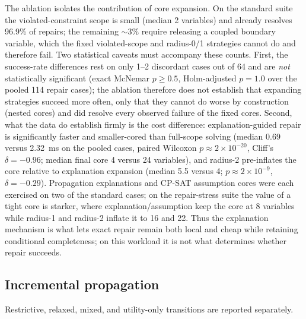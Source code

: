 \documentclass[pdflatex,sn-mathphys-num,iicol,oneside]{sn-jnl}
\begin{document}
The ablation isolates the contribution of core expansion. On the
standard suite the violated-constraint scope is small (median 2
variables) and already resolves 96.9\% of repairs; the remaining
$\sim 3\%$ require releasing a coupled boundary variable, which the
fixed violated-scope and radius-0/1 strategies cannot do and therefore
fail. Two statistical caveats must accompany these counts. First, the
success-rate differences rest on only 1--2 discordant cases out of 64
and are \emph{not} statistically significant (exact McNemar
$p\ge 0.5$, Holm-adjusted $p=1.0$ over the pooled 114 repair cases);
the ablation therefore does not establish that expanding strategies
succeed more often, only that they cannot do worse by construction
(nested cores) and did resolve every observed failure of the fixed
cores. Second, what the data do establish firmly is the cost
difference: explanation-guided repair is significantly faster and
smaller-cored than full-scope solving (median 0.69 versus 2.32~ms on
the pooled cases, paired Wilcoxon $p\approx 2\times10^{-20}$, Cliff's
$\delta=-0.96$; median final core 4 versus 24 variables), and radius-2
pre-inflates the core relative to explanation expansion (median 5.5
versus 4; $p\approx 2\times10^{-9}$, $\delta=-0.29$). Propagation
explanations and CP-SAT assumption cores were each exercised on two of
the standard cases; on the repair-stress suite the value of a tight
core is starker, where explanation/assumption keep the core at 8
variables while radius-1 and radius-2 inflate it to 16 and 22. Thus the
explanation mechanism is what lets exact repair remain both local and
cheap while retaining conditional completeness; on this workload it is
not what determines whether repair succeeds.

\subsection{Incremental propagation}

Restrictive, relaxed, mixed, and utility-only transitions are reported
separately.
\end{document}
